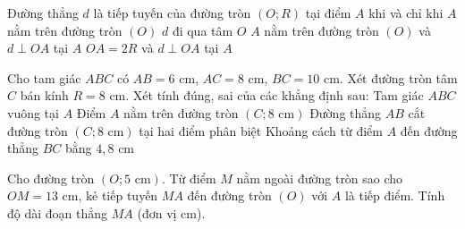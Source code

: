 

\begin{ex}%
	Đường thẳng $d$ là tiếp tuyến của đường tròn $(O; R)$ tại điểm $A$ khi và chỉ khi
	\choice
	{$A$ nằm trên đường tròn $(O)$}
	{$d$ đi qua tâm $O$}
	{\True $A$ nằm trên đường tròn $(O)$ và $d \perp OA$ tại $A$}
	{$OA = 2R$ và $d \perp OA$ tại $A$}
\end{ex}

\begin{ex}%
	Cho tam giác $ABC$ có $AB = 6\text{ cm}$, $AC = 8\text{ cm}$, $BC = 10\text{ cm}$. Xét đường tròn tâm $C$ bán kính $R = 8\text{ cm}$. Xét tính đúng, sai của các khẳng định sau:
	\choiceTF
	{\True Tam giác $ABC$ vuông tại $A$}
	{\True Điểm $A$ nằm trên đường tròn $(C; 8\text{ cm})$}
	{Đường thẳng $AB$ cắt đường tròn $(C; 8\text{ cm})$ tại hai điểm phân biệt}
	{\True Khoảng cách từ điểm $A$ đến đường thẳng $BC$ bằng $4{,}8\text{ cm}$}
\end{ex}

\begin{bt}%
	Cho đường tròn $(O; 5\text{ cm})$. Từ điểm $M$ nằm ngoài đường tròn sao cho $OM = 13\text{ cm}$, kẻ tiếp tuyến $MA$ đến đường tròn $(O)$ với $A$ là tiếp điểm. Tính độ dài đoạn thẳng $MA$ (đơn vị cm).
\end{bt}

